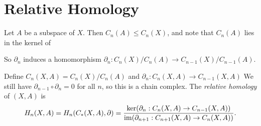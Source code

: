 \section{Relative Homology}
\begin{remark}
  Let $A$ be a subspace of $X$. Then $C_n(A) \le C_n(X)$,
  and note that $C_n(A)$ lies in the kernel of
  \begin{center}
  \end{center}
  So $\partial_n$ induces a homomorphism
  $\partial_n : C_n(X) / C_n(A) \to C_{n - 1}(X) / C_{n - 1}(A)$.
\end{remark}

\begin{definition}
  Define $C_n(X, A) = C_n(X) / C_n(A)$ and
  $\partial_n : C_n(X, A) \to C_{n - 1}(X, A)$
  We still have $\partial_{n - 1} \circ \partial_n = 0$
  for all $n$, so this is a chain complex.
  The \emph{relative homology} of $(X, A)$ is
  \[
    H_n(X, A)
    = H_n(C_*(X, A), \partial)
    = \frac{\ker(\partial_n : C_n(X, A) \to C_{n - 1}(X, A))}{\operatorname{im}(\partial_{n + 1} : C_{n + 1}(X, A) \to C_{n}(X, A))}.
  \]
\end{definition}
